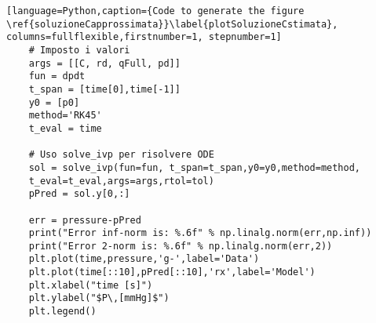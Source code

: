 \begin{lstlisting}[language=Python,caption={Code to generate the figure \ref{soluzioneCapprossimata}}\label{plotSoluzioneCstimata}, columns=fullflexible,firstnumber=1, stepnumber=1]
    # Imposto i valori
    args = [[C, rd, qFull, pd]]
    fun = dpdt
    t_span = [time[0],time[-1]]
    y0 = [p0]
    method='RK45'
    t_eval = time

    # Uso solve_ivp per risolvere ODE
    sol = solve_ivp(fun=fun, t_span=t_span,y0=y0,method=method,
    t_eval=t_eval,args=args,rtol=tol)
    pPred = sol.y[0,:]

    err = pressure-pPred
    print("Error inf-norm is: %.6f" % np.linalg.norm(err,np.inf))
    print("Error 2-norm is: %.6f" % np.linalg.norm(err,2))
    plt.plot(time,pressure,'g-',label='Data')
    plt.plot(time[::10],pPred[::10],'rx',label='Model')
    plt.xlabel("time [s]")
    plt.ylabel("$P\,[mmHg]$")
    plt.legend()
\end{lstlisting}